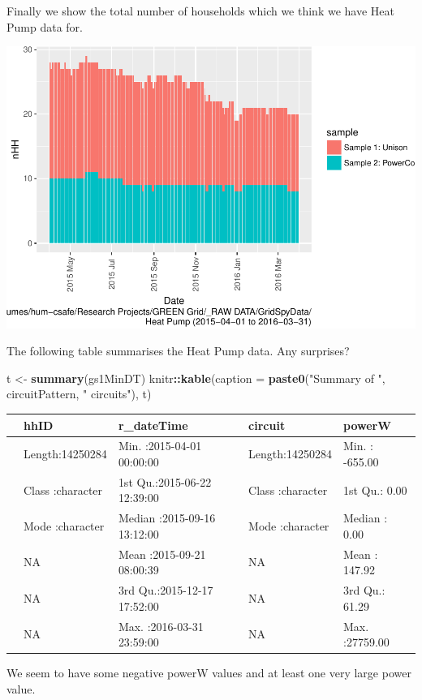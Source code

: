 \documentclass[]{article}
\newenvironment{Shaded}{\begin{snugshade}}{\end{snugshade}}
\newcommand{\KeywordTok}[1]{\textcolor[rgb]{0.13,0.29,0.53}{\textbf{#1}}}
\newcommand{\DataTypeTok}[1]{\textcolor[rgb]{0.13,0.29,0.53}{#1}}
\newcommand{\StringTok}[1]{\textcolor[rgb]{0.31,0.60,0.02}{#1}}
\newcommand{\OperatorTok}[1]{\textcolor[rgb]{0.81,0.36,0.00}{\textbf{#1}}}
\newcommand{\NormalTok}[1]{#1}
\begin{document}
Finally we show the total number of households which we think we have
Heat Pump data for.

\includegraphics{nzGGHouseholdPowerDemandProfile_Heat Pump_2015-04-01_2016-03-31_files/figure-latex/liveDataHouseholds-1.pdf}

The following table summarises the Heat Pump data. Any surprises?

\begin{Shaded}
\begin{Highlighting}[]
\NormalTok{t <-}\StringTok{ }\KeywordTok{summary}\NormalTok{(gs1MinDT)}
\NormalTok{knitr}\OperatorTok{::}\KeywordTok{kable}\NormalTok{(}\DataTypeTok{caption =} \KeywordTok{paste0}\NormalTok{(}\StringTok{"Summary of "}\NormalTok{, circuitPattern, }\StringTok{" circuits"}\NormalTok{), t)}
\end{Highlighting}
\end{Shaded}

\begin{longtable}[]{@{}lllll@{}}
\toprule
& hhID & r\_dateTime & circuit & powerW\tabularnewline
\midrule
\endhead
& Length:14250284 & Min. :2015-04-01 00:00:00 & Length:14250284 & Min. :
-655.00\tabularnewline
& Class :character & 1st Qu.:2015-06-22 12:39:00 & Class :character &
1st Qu.: 0.00\tabularnewline
& Mode :character & Median :2015-09-16 13:12:00 & Mode :character &
Median : 0.00\tabularnewline
& NA & Mean :2015-09-21 08:00:39 & NA & Mean : 147.92\tabularnewline
& NA & 3rd Qu.:2015-12-17 17:52:00 & NA & 3rd Qu.: 61.29\tabularnewline
& NA & Max. :2016-03-31 23:59:00 & NA & Max. :27759.00\tabularnewline
\bottomrule
\end{longtable}

We seem to have some negative powerW values and at least one very large
power value.
\end{document}

